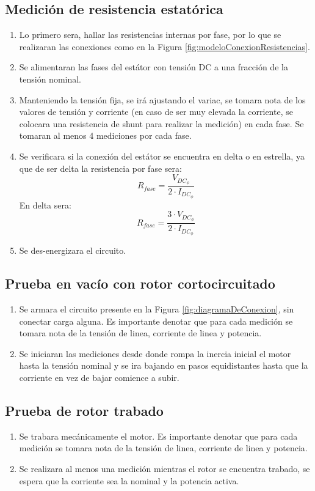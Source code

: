 \documentclass[11pt,letterpaper]{article}     %
\begin{document}
\subsection{Medición de resistencia estatórica}
\begin{enumerate}
	\item Lo primero sera, hallar las resistencias internas por fase, por lo que se realizaran las conexiones como en la Figura \ref{fig:modeloConexionResistencias}.
	\item Se alimentaran las fases del estátor con tensión DC a una fracción de la tensión nominal.
	\item Manteniendo la tensión fija, se irá ajustando el variac, se tomara nota de los valores de tensión y corriente (en caso de ser muy elevada la corriente, se colocara una resistencia de shunt para realizar la medición) en cada fase. Se tomaran al menos 4 mediciones por cada fase.
	\item Se verificara si la conexión del estátor se encuentra en delta o en estrella, ya que de ser delta la resistencia por fase sera:
	\begin{equation}
	R_{fase} = \frac{V_{DC_{\phi}}}{2\cdot I_{DC_{\phi}}}
	\end{equation} 
	En delta sera:
	\begin{equation}
	R_{fase} = \frac{3\cdot V_{DC_{\phi}}}{2\cdot I_{DC_{\phi}}}
	\end{equation} 
	\item Se des-energizara el circuito.
\end{enumerate}
\subsection{Prueba en vacío con rotor cortocircuitado}
\begin{enumerate}
	\item Se armara el circuito presente en la Figura \ref{fig:diagramaDeConexion}, sin conectar carga alguna. Es importante denotar que para cada medición se tomara nota de la tensión  de linea, corriente de linea y potencia.
	\item Se iniciaran las mediciones desde donde rompa la inercia inicial el motor hasta la tensión nominal y se ira bajando en pasos equidistantes hasta que la corriente en vez de bajar comience a subir.
\end{enumerate}
\subsection{Prueba de rotor trabado}
\begin{enumerate}
	\item Se trabara mecánicamente el motor. Es importante denotar que para cada medición se tomara nota de la tensión  de linea, corriente de linea y potencia.
	\item Se realizara al menos una medición mientras el rotor se encuentra trabado, se espera que la corriente sea la nominal y la potencia activa.
\end{enumerate}
\end{document}

